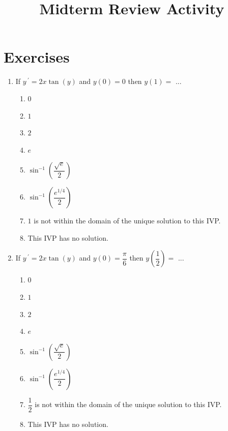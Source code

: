 \documentclass{ximera}
\newenvironment{mcenum}
{ \begin{enumerate}[itemsep=1em, topsep=1em, label=$\bigcirc$ (\alph*), align=left]
     }
{ \end{enumerate}                  }
\begin{document}
\begin{abstract}
 \end{abstract}

    \title{Midterm Review Activity}
    
    \maketitle

\section*{Exercises}



\begin{enumerate}[label=(\arabic*)]

\item  If $y\,^{\prime}=2x\tan{(y)}$ and $y(0)=0$ then $y\left(1\right)=$ ...

\begin{mcenum}
\item $0$ %
\item $1$
\item $2$
\item $e$
\item $\sin^{-1}{\left(\dfrac{\sqrt{e}}{2}\right)}$
\item $\sin^{-1}{\left(\dfrac{e^{1/4}}{2}\right)}$ 
\item $1$ is not within the domain of the unique solution to this IVP.
\item This IVP has no solution.
\end{mcenum}


\newpage

\item If $y\,^{\prime}=2x\tan{(y)}$ and $y(0)=\dfrac{\pi}{6}$ then $y\left(\dfrac{1}{2}\right)=$ ...



\begin{mcenum}
\item $0$
\item $1$
\item $2$
\item $e$
\item $\sin^{-1}{\left(\dfrac{\sqrt{e}}{2}\right)}$
\item $\sin^{-1}{\left(\dfrac{e^{1/4}}{2}\right)}$ %
\item $\dfrac{1}{2}$ is not within the domain of the unique solution to this IVP.
\item This IVP has no solution.
\end{mcenum}


\end{enumerate}
\end{document}
